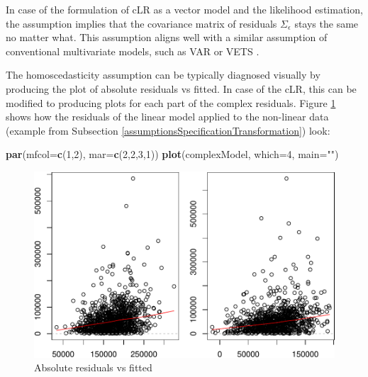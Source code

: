 \documentclass[
]{book}
\newenvironment{Shaded}{\begin{snugshade}}{\end{snugshade}}
\newcommand{\DataTypeTok}[1]{\textcolor[rgb]{0.13,0.29,0.53}{#1}}
\newcommand{\DecValTok}[1]{\textcolor[rgb]{0.00,0.00,0.81}{#1}}
\newcommand{\KeywordTok}[1]{\textcolor[rgb]{0.13,0.29,0.53}{\textbf{#1}}}
\newcommand{\NormalTok}[1]{#1}
\newcommand{\StringTok}[1]{\textcolor[rgb]{0.31,0.60,0.02}{#1}}
\begin{document}
In case of the formulation of cLR as a vector model and the likelihood estimation, the assumption implies that the covariance matrix of residuals \(\Sigma_\epsilon\) stays the same no matter what. This assumption aligns well with a similar assumption of conventional multivariate models, such as VAR \citep{Lutkepohl} or VETS \citep{SvetunkovVETS}.

The homoscedasticity assumption can be typically diagnosed visually by producing the plot of absolute residuals vs fitted. In case of the cLR, this can be modified to producing plots for each part of the complex residuals. Figure \ref{fig:heteroDiagnostics} shows how the residuals of the linear model applied to the non-linear data (example from Subsection \ref{assumptionsSpecificationTransformation}) look:

\begin{Shaded}
\begin{Highlighting}[]
\KeywordTok{par}\NormalTok{(}\DataTypeTok{mfcol=}\KeywordTok{c}\NormalTok{(}\DecValTok{1}\NormalTok{,}\DecValTok{2}\NormalTok{), }\DataTypeTok{mar=}\KeywordTok{c}\NormalTok{(}\DecValTok{2}\NormalTok{,}\DecValTok{2}\NormalTok{,}\DecValTok{3}\NormalTok{,}\DecValTok{1}\NormalTok{))}
\KeywordTok{plot}\NormalTok{(complexModel, }\DataTypeTok{which=}\DecValTok{4}\NormalTok{, }\DataTypeTok{main=}\StringTok{""}\NormalTok{)}
\end{Highlighting}
\end{Shaded}

\begin{figure}
\centering
\includegraphics{Svetunkov---Svetunkov---Complex-Valued-Econometrics_files/figure-latex/heteroDiagnostics-1.pdf}
\caption{\label{fig:heteroDiagnostics}Absolute residuals vs fitted}
\end{figure}
\end{document}
